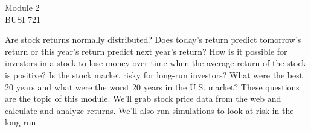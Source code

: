 \documentclass[english,12pt]{amsart}
\begin{document}
\begin{center}
    Module 2\\
    BUSI 721\\
\end{center}

\baselineskip

Are stock returns normally distributed?  Does today's return predict tomorrow's return or this year's return predict next year's return?  How is it possible for investors in a stock to lose money over time when the average return of the stock is positive?  Is the stock market risky for long-run investors?  What were the best 20 years and what were the worst 20 years in the U.S. market?  These questions are the topic of this module.  We'll grab stock price data from the web and calculate and analyze returns.  We'll also run simulations to look at risk in the long run.
\end{document}
